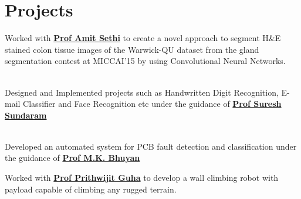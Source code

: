 \documentclass[]{deedy-resume-openfont}
\begin{document}
\begin{minipage}[t]{0.66\textwidth}

\section{Projects}
Worked with \textbf{\href{http://www.iitg.ernet.in/eee/amitsethi.html}{Prof Amit Sethi}} to create a novel approach to segment H\&E stained colon tissue images of the Warwick-QU dataset from the gland segmentation contest at MICCAI'15 by using Convolutional Neural Networks.
\sectionsep

\\
Designed and Implemented projects such as Handwritten Digit Recognition, E-mail Classifier and Face Recognition etc under the guidance of \textbf{\href{http://www.iitg.ernet.in/eee/suresh.html}{Prof Suresh Sundaram}}
\sectionsep

\\
Developed an automated system for PCB fault detection and classification under the guidance of \textbf{\href{http://www.iitg.ernet.in/eee/mkb.html}{Prof M.K. Bhuyan}} 
\sectionsep

Worked with \textbf{\href{http://www.iitg.ernet.in/eee/pguha.html}{Prof Prithwijit Guha}} to develop a wall climbing robot with payload capable of climbing any rugged terrain.
\sectionsep



\end{minipage}
\end{document}
